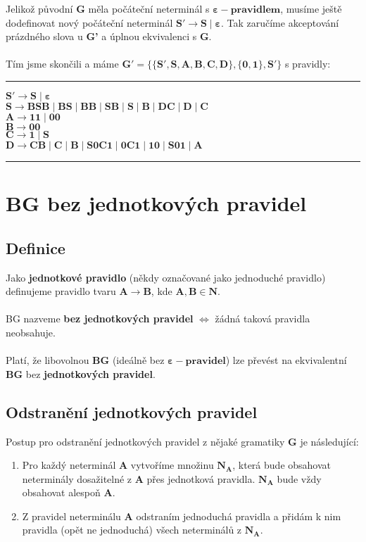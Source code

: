 \documentclass{report}
\begin{document}
Jelikož původní \textbf{G} měla počáteční neterminál s $\mathbf{\varepsilon-pravidlem}$, musíme ještě dodefinovat nový počáteční neterminál $\mathbf{S' \rightarrow S \mid \varepsilon}$. Tak zaručíme akceptování prázdného slova u \textbf{G'} a úplnou ekvivalenci s \textbf{G}.\\ \\ Tím jsme skončili a máme $\mathbf{G'=\{\{S',S,A,B,C,D\},\{0,1\},S'\}}$ s pravidly:
\vspace{0.4cm}    
\hrule
\vspace{0.1cm}
\begin{description}
    \item[$\mathbf{S' \rightarrow S \mid \varepsilon}$]
    \item[$\mathbf{S \rightarrow BSB \mid BS \mid BB \mid SB \mid S \mid B \mid DC \mid D \mid C}$]
    \item[$\mathbf{A \rightarrow 11 \mid 00}$]
    \item[$\mathbf{B \rightarrow 00 }$]
    \item[$\mathbf{C \rightarrow 1 \mid S}$]
    \item[$\mathbf{D \rightarrow CB \mid C \mid B \mid S0C1 \mid 0C1 \mid 10 \mid S01 \mid A}$]
\end{description}
\vspace{0.1cm}    
\hrule
\vspace{0.4cm} 
\section{BG bez jednotkových pravidel}
\subsection*{Definice}
Jako \textbf{jednotkové pravidlo} (někdy označované jako jednoduché pravidlo) definujeme pravidlo tvaru $\mathbf{A \rightarrow B}$, kde $\mathbf{A,B \in N}$.\\ \\
BG nazveme \textbf{bez jednotkových pravidel} $\iff$ žádná taková pravidla neobsahuje.\\ \\
Platí, že libovolnou \textbf{BG} (ideálně bez $\mathbf{\varepsilon-pravidel}$) lze převést na ekvivalentní \textbf{BG} bez \textbf{jednotkových pravidel}.
\subsection*{Odstranění jednotkových pravidel}
Postup pro odstranění jednotkových pravidel z nějaké gramatiky \textbf{G} je následující:
\begin{enumerate}
    \item Pro každý neterminál \textbf{A} vytvoříme množinu $\mathbf{N_{A}}$, která bude obsahovat neterminály dosažitelné z \textbf{A} přes jednotková pravidla. $\mathbf{N_{A}}$ bude vždy obsahovat alespoň \textbf{A}.
    \item Z pravidel neterminálu \textbf{A} odstraním jednoduchá pravidla a přidám k nim pravidla (opět ne jednoduchá) všech neterminálů z $\mathbf{N_{A}}$.
\end{enumerate}
\pagebreak
\end{document}

